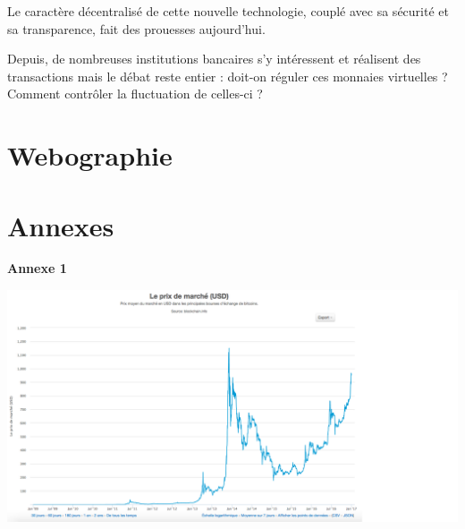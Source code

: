 \documentclass[12pt]{report}
\begin{document}
 Le caractère décentralisé de cette nouvelle technologie, couplé avec sa sécurité et sa transparence, fait des prouesses aujourd’hui.
 
 Depuis, de nombreuses institutions bancaires s’y intéressent et réalisent des transactions mais le débat reste entier : doit-on réguler ces monnaies virtuelles ? Comment contrôler la fluctuation de celles-ci ? \\

\newpage
\section{Webographie}

\newpage
\section{Annexes}

\textbf{Annexe 1}\\
\begin{center}
    \includegraphics[width=1.3\textwidth]{courbeBTC}
\end{center}
\end{document}
